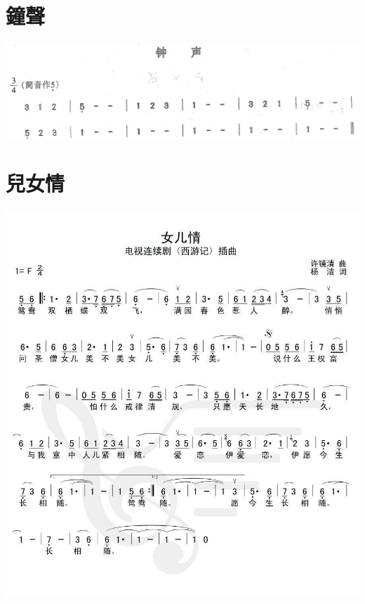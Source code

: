 \documentclass[cn,pad,twocol]{elegantbook}
\begin{document}
\section{鐘聲}
	\includegraphics[width=\textwidth]{dongxiao/20200711-钟声.jpg}
\section{兒女情}          
	\includegraphics[width=\textwidth]{dongxiao/西游记-儿女情}  
\end{document}
